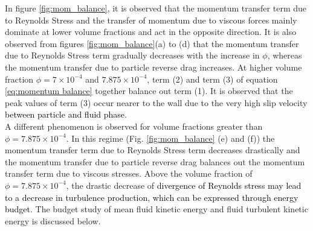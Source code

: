 \documentclass[aip,graphicx]{revtex4-1}
\begin{document}
In figure \ref{fig:mom_balance}, it is observed that the momentum transfer term due to Reynolds Stress and the transfer of momentum due to viscous forces mainly dominate at lower volume fractions and act in the opposite direction. It is also observed from figures \ref{fig:mom_balance}(a) to (d) that the momentum transfer due to Reynolds Stress term gradually decreases with the increase in $\phi$, whereas the momentum transfer due to particle reverse drag increases. At higher volume fraction $\phi=7\times10^{-4}$ and $7.875\times10^{-4}$, term (2) and term (3) of equation \ref{eq:momentum balance} together balance out term (1). It is observed that the peak values of term (3) occur nearer to the wall due to the very high slip velocity \textcolor{black}{between particle and fluid phase}. \\ 
A different phenomenon is observed for volume fractions greater than $\phi=7.875\times10^{-4}$. In this regime (Fig. \ref{fig:mom_balance} (e) and (f)) the momentum transfer term due to Reynolds Stress term  decreases drastically and the momentum transfer due to particle reverse drag balances out the momentum transfer term due to viscous stresses.  Above the volume fraction of $\phi=7.875\times10^{-4}$, the drastic decrease of \textcolor{black}{divergence of Reynolds stress may lead to a decrease in turbulence production, which can be expressed through energy budget}. The budget study of mean fluid kinetic energy and fluid turbulent kinetic energy is discussed below.  
\end{document}
